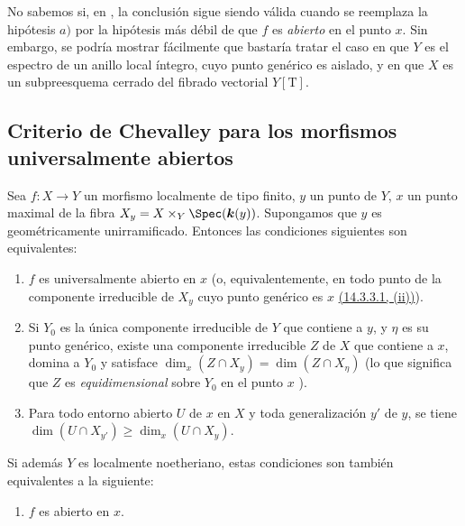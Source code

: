 \begin{remark}[14.3.14]
\label{IV.14.3.14}
No sabemos si, en , la conclusión sigue siendo válida cuando se reemplaza la hipótesis $a)$ por la hipótesis más débil de que $f$ es \emph{abierto} en el punto $x$.
Sin embargo, se podría mostrar fácilmente que bastaría tratar el caso en que $Y$ es el espectro de un anillo local íntegro, cuyo punto genérico es aislado, y en que $X$ es un subpreesquema cerrado del fibrado vectorial $Y[\mathrm{T}]$.
\end{remark}
\subsection{Criterio de Chevalley para los morfismos universalmente abiertos}
\label{subsection:IV.14.4}

\begin{theorem}[14.4.1]
\label{IV.14.4.1}
Sea $f:X\to Y$ un morfismo localmente de tipo finito, $y$ un punto de $Y$, $x$ un punto maximal de la fibra $X_y=X\times_Y\Spec(\boldsymbol{k}(y))$.
Supongamos que $y$ es \textup{geométricamente unirramificado}.
Entonces las condiciones siguientes son equivalentes:
\begin{enumerate}[label=\emph{\alph*)}]
  \item $f$ es universalmente abierto en $x$ \textup{(o, equivalentemente, en todo punto de la componente irreducible de $X_y$ cuyo punto genérico es $x$ {\hyperlink{ega4.c04.subsec.14-3-3-1}{(14.3.3.1, (ii))}})}.
  \item Si $Y_0$ es la única componente irreducible de $Y$ que contiene a $y$, y $\eta$ es su punto genérico, existe una componente irreducible $Z$ de $X$ que contiene a $x$, domina a $Y_0$ y satisface $\dim_x(Z\cap X_y)=\dim(Z\cap X_\eta)$ \textup{(lo que significa que $Z$ es \emph{equidimensional} sobre $Y_0$ en el punto $x$ )}.
  \item[\emph{b$'$)}] Para todo entorno abierto $U$ de $x$ en $X$ y toda generalización $y'$ de $y$, se tiene $\dim(U\cap X_{y'})\geq\dim_x(U\cap X_y)$.
\end{enumerate}
Si además $Y$ es localmente noetheriano, estas condiciones son también equivalentes a la siguiente:
\begin{enumerate}[label=\emph{\alph*)}]
  \item[\emph{c)}] $f$ es abierto en $x$.
\end{enumerate}
\end{theorem}

